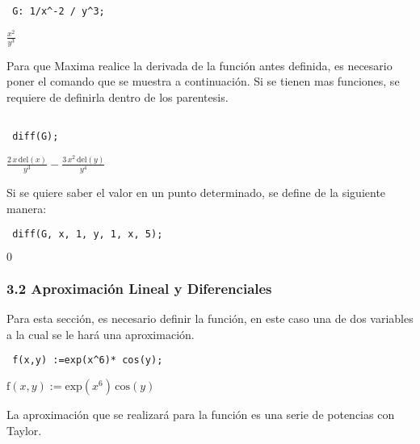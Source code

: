 \documentclass[12pt]{article}
\begin{document}
\begin{verbatim}
 G: 1/x^-2 / y^3;
\end{verbatim}


\begin{math}\displaystyle
\frac{{x}^{2}}{{y}^{3}}
\end{math}

Para que Maxima realice la derivada de la función antes definida, es necesario poner el comando que se muestra a continuación. Si se tienen mas funciones, se requiere de definirla dentro de los parentesis.
\noindent
\begin{verbatim}

 diff(G);
\end{verbatim}


\begin{math}
\frac{2\,x\,\mathrm{del}\left( x\right) }{{y}^{3}}-\frac{3\,{x}^{2}\,\mathrm{del}\left( y\right) }{{y}^{4}}
\end{math}

Si se quiere saber el valor en un punto determinado, se define de la siguiente manera:

\noindent

\begin{verbatim}
 diff(G, x, 1, y, 1, x, 5);
\end{verbatim}

\begin{math}
0
\end{math}

\subsubsection*{3.2 Aproximación Lineal y Diferenciales}

Para esta sección, es necesario definir la función, en este caso una de dos variables a la cual se le hará una aproximación.
\noindent
\begin{verbatim}
 f(x,y) :=exp(x^6)* cos(y);
\end{verbatim}
\begin{math}
\mathrm{f}\left( x,y\right) :=\mathrm{exp}\left( {x}^{6}\right) \,\mathrm{cos}\left( y\right) 
\end{math}

La aproximación que se realizará para la función es una serie de potencias con Taylor.
\end{document}
